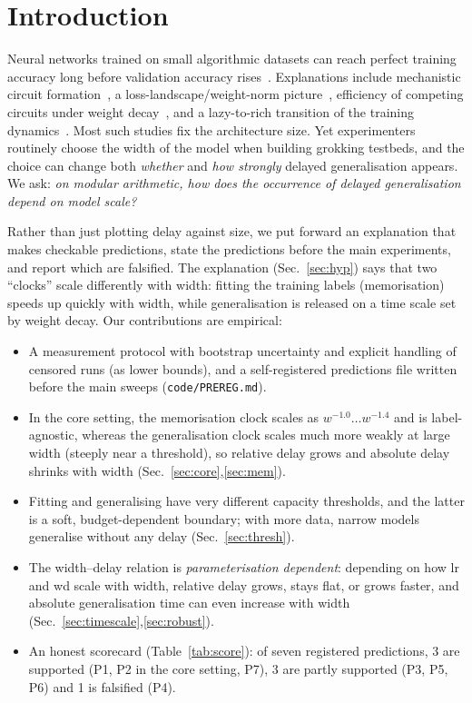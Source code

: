 \documentclass{article}
\begin{document}
\section{Introduction}
Neural networks trained on small algorithmic datasets can reach perfect training accuracy long before validation accuracy rises~\citep{power2022grokking}.
Explanations include mechanistic circuit formation~\citep{nanda2023progress}, a loss-landscape/weight-norm picture~\citep{liu2023omnigrok},
efficiency of competing circuits under weight decay~\citep{varma2023circuit}, and a lazy-to-rich transition of the training dynamics~\citep{kumar2024grokking}.
Most such studies fix the architecture size. Yet experimenters routinely choose the width of the model when building grokking testbeds,
and the choice can change both \emph{whether} and \emph{how strongly} delayed generalisation appears. We ask:
\emph{on modular arithmetic, how does the occurrence of delayed generalisation depend on model scale?}

Rather than just plotting delay against size, we put forward an explanation that makes checkable predictions, state the predictions before the main
experiments, and report which are falsified. The explanation (Sec.~\ref{sec:hyp}) says that two ``clocks'' scale differently with width:
fitting the training labels (memorisation) speeds up quickly with width, while generalisation is released on a time scale set by weight decay.
Our contributions are empirical:
\begin{itemize}\setlength\itemsep{0pt}
\item A measurement protocol with bootstrap uncertainty and explicit handling of censored runs (as lower bounds), and a self-registered predictions file written before the main sweeps (\texttt{code/PREREG.md}).
\item In the core setting, the memorisation clock scales as $w^{-1.0}\!\ldots w^{-1.4}$ and is label-agnostic, whereas the generalisation clock
scales much more weakly at large width (steeply near a threshold), so relative delay grows and absolute delay shrinks with width (Sec.~\ref{sec:core},\ref{sec:mem}).
\item Fitting and generalising have very different capacity thresholds, and the latter is a soft, budget-dependent boundary; with more data, narrow models generalise without any delay (Sec.~\ref{sec:thresh}).
\item The width--delay relation is \emph{parameterisation dependent}: depending on how lr and wd scale with width, relative delay grows, stays flat, or grows faster, and absolute generalisation time can even increase with width (Sec.~\ref{sec:timescale},\ref{sec:robust}).
\item An honest scorecard (Table~\ref{tab:score}): of seven registered predictions, 3 are supported (P1, P2 in the core setting, P7), 3 are partly supported (P3, P5, P6) and 1 is falsified (P4).
\end{itemize}
\end{document}
